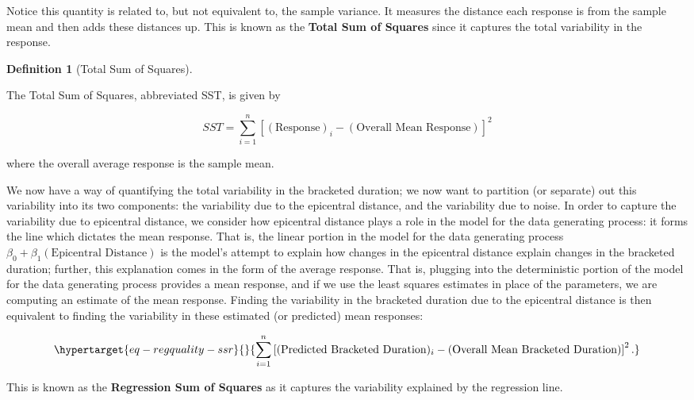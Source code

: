 \documentclass[
  letterpaper,
  DIV=11,
  numbers=noendperiod]{scrreprt}
\theoremstyle{definition}
\newtheorem{definition}{Definition}[chapter]
\theoremstyle{definition}
\theoremstyle{plain}
\theoremstyle{remark}
\begin{document}
Notice this quantity is related to, but not equivalent to, the sample
variance. It measures the distance each response is from the sample mean
and then adds these distances up. This is known as the \textbf{Total Sum
of Squares} since it captures the total variability in the response.

\begin{definition}[Total Sum of
Squares]\protect\hypertarget{def-sst}{}\label{def-sst}

The Total Sum of Squares, abbreviated SST, is given by

\[SST = \sum_{i=1}^{n} \left[(\text{Response})_i - (\text{Overall Mean Response})\right]^2\]

where the overall average response is the sample mean.

\end{definition}

We now have a way of quantifying the total variability in the bracketed
duration; we now want to partition (or separate) out this variability
into its two components: the variability due to the epicentral distance,
and the variability due to noise. In order to capture the variability
due to epicentral distance, we consider how epicentral distance plays a
role in the model for the data generating process: it forms the line
which dictates the mean response. That is, the linear portion in the
model for the data generating process
\(\beta_0 + \beta_1 (\text{Epicentral Distance})\) is the model's
attempt to explain how changes in the epicentral distance explain
changes in the bracketed duration; further, this explanation comes in
the form of the average response. That is, plugging into the
deterministic portion of the model for the data generating process
provides a mean response, and if we use the least squares estimates in
place of the parameters, we are computing an estimate of the mean
response. Finding the variability in the bracketed duration due to the
epicentral distance is then equivalent to finding the variability in
these estimated (or predicted) mean responses:

\begin{equation}\protect\hypertarget{eq-regquality-ssr}{}{\sum_{i=1}^{n} \left[(\text{Predicted Bracketed Duration})_i - (\text{Overall Mean Bracketed Duration})\right]^2.}\label{eq-regquality-ssr}\end{equation}

This is known as the \textbf{Regression Sum of Squares} as it captures
the variability explained by the regression line.
\end{document}

